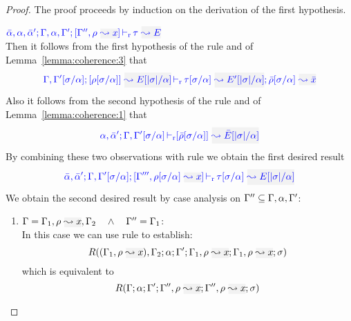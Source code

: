 \begin{proof}
The proof proceeds by induction on the derivation of the first hypothesis.
\begin{description}
\setlength{\itemsep}{1em}
\item[\fbox{\rref{L-RuleMatch}}]\quad$
\dlres{\bar{\alpha},\alpha,\bar{\alpha}'}{\tenv,\alpha,\tenv'}{\tenv'',\ie{\rulet}{x}}{\type}{E}
$ \ \\

  Then it follows from the first hypothesis of the rule and of Lemma~\ref{lemma:coherence:3}
  that
\begin{equation*}
\dmres{\tenv,\tenv'[\suty/\alpha]}{\rulet[\suty/\alpha]}{E[|\suty|/\alpha]}{\type[\suty/\alpha]}{E'[|\suty|/\alpha]}{\ie{\ruleset[\suty/\alpha]}{\bar{x}}}
\end{equation*}
  Also it follows from the second hypothesis of the rule and of Lemma~\ref{lemma:coherence:1}
  that
\begin{equation*}
\drres{{\alpha},\bar{\alpha}'}{\tenv,\tenv'[\suty/\alpha]}{\ruleset[\suty/\alpha]}{\bar{E}[|\suty|/\alpha]}
\end{equation*}
  By combining these two observations with rule  we obtain the first desired result
\begin{equation*}
\dlres{\bar{\alpha},\bar{\alpha}'}{\tenv,\tenv'[\suty/\alpha]}{\tenv''',\ie{\rulet[\suty/\alpha]}{x}}{\type[\suty/\alpha]}{E[|\suty|/\alpha]}
\end{equation*}  
  We obtain the second desired result by case analysis on $\Gamma'' \subseteq \Gamma,\alpha,\Gamma'$:
  \begin{enumerate}
  \item $\tenv = \tenv_1,\ie{\rulet}{x},\tenv_2 \quad\wedge\quad \tenv'' = \tenv_1$: \\
  In this case we can use rule  to establish:
\begin{equation*}
  R((\tenv_1,\ie{\rulet}{x}),\tenv_2;\alpha;\tenv';\tenv_1,\ie{\rulet}{x};\tenv_1,\ie{\rulet}{x};\sigma)
\end{equation*}
  which is equivalent to
\begin{equation*}
  R(\tenv;\alpha;\tenv';\tenv'',\ie{\rulet}{x};\tenv'',\ie{\rulet}{x};\sigma)
\end{equation*}


\end{enumerate}
\end{description}
\end{proof}
